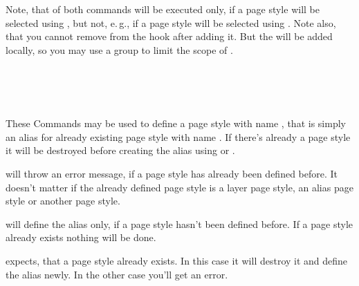 Note, that  of both commands will be executed
only, if a page style will be selected using , but not,
e.\,g., if a page style will be selected using . Note
also, that you cannot remove  from the hook after adding it. But
the  will be added locally, so you may use a group to limit the
scope of .%

\begin{Declaration}
  \\
  \\
  \\
\end{Declaration}
%
%
%
%
These Commands may be used to define a page style with name , that is simply an alias for already existing page style with
name . If there's already a page style
 it will be destroyed before creating the alias
using  or .

 will throw an error message, if a page style
 has already been defined before. It doesn't
matter if the already defined page style is a layer page style, an alias page
style or another page style.

 will define the alias only, if a page style
 hasn't been defined before. If a page style
 already exists nothing will be done.

 expects, that a page style  already exists. In this case it will destroy it and define the
alias newly. In the other case you'll get an error.%
%
%
%

